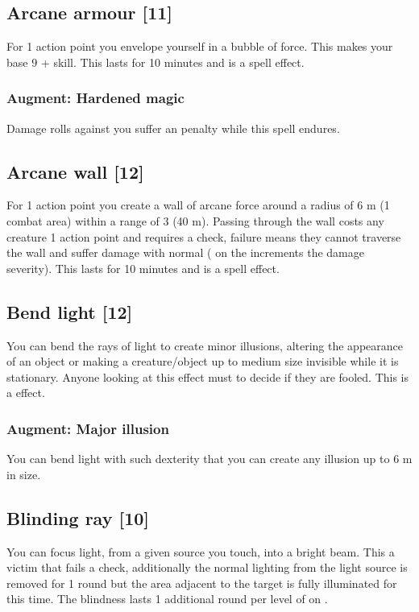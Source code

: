 \subsection{Arcane armour [11]}
\label{spell:arcane-armour}
For 1 action point you envelope yourself in a bubble of force. This makes your base  $9$ +  skill. This lasts for 10 minutes and is a  spell effect.
\subsubsection{Augment: Hardened magic}
Damage rolls against you suffer an  penalty while this spell endures.

\subsection{Arcane wall [12]}
For 1 action point you create a wall of arcane force around a radius of 6 m (1 combat area) within a range of 3 (40 m). Passing through the wall costs any creature 1 action point and requires a  check, failure means they cannot traverse the wall and suffer damage with normal  ( on the  increments the damage severity). This lasts for 10 minutes and is a  spell effect.

\subsection{Bend light [12]}
\label{spell:bend-light}
You can bend the rays of light to create minor illusions, altering the appearance of an object or making a creature/object up to medium size invisible while it is stationary. Anyone looking at this effect must  to decide if they are fooled. This is a  effect.
\subsubsection{Augment: Major illusion}
You can bend light with such dexterity that you can create any illusion up to 6 m in size. 

\subsection{Blinding ray [10]}
\label{spell:blind-ray}
You can focus light, from a given source you touch, into a bright beam. This  a victim that fails a  check, additionally the normal lighting from the light source is removed for 1 round but the area adjacent to the target is fully illuminated for this time. The blindness lasts 1 additional round per level of  on .

